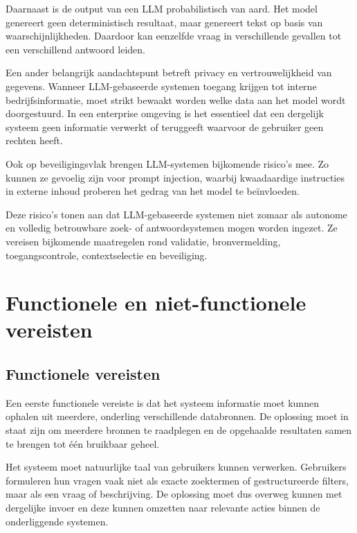 Daarnaast is de output van een \gls{LLM} probabilistisch van aard. Het model genereert geen deterministisch resultaat, maar genereert tekst op basis van waarschijnlijkheden. Daardoor kan eenzelfde vraag in verschillende gevallen tot een verschillend antwoord leiden.

Een ander belangrijk aandachtspunt betreft privacy en vertrouwelijkheid van gegevens. Wanneer \gls{LLM}-gebaseerde systemen toegang krijgen tot interne bedrijfsinformatie, moet strikt bewaakt worden welke data aan het model wordt doorgestuurd. In een enterprise omgeving is het essentieel dat een dergelijk systeem geen informatie verwerkt of teruggeeft waarvoor de gebruiker geen rechten heeft.

Ook op beveiligingsvlak brengen \gls{LLM}-systemen bijkomende risico's mee. Zo kunnen ze gevoelig zijn voor prompt injection, waarbij kwaadaardige instructies in externe inhoud proberen het gedrag van het model te beïnvloeden.

Deze risico's tonen aan dat \gls{LLM}-gebaseerde systemen niet zomaar als autonome en volledig betrouwbare zoek- of antwoordsystemen mogen worden ingezet. Ze vereisen bijkomende maatregelen rond validatie, bronvermelding, toegangscontrole, contextselectie en beveiliging.

\section{Functionele en niet-functionele vereisten}
\label{sec:vereisten}


\subsection{Functionele vereisten}
\label{subsec:functionele-vereisten}

Een eerste functionele vereiste is dat het systeem informatie moet kunnen ophalen uit meerdere, onderling verschillende databronnen. De oplossing moet in staat zijn om meerdere bronnen te raadplegen en de opgehaalde resultaten samen te brengen tot één bruikbaar geheel.

Het systeem moet natuurlijke taal van gebruikers kunnen verwerken. Gebruikers formuleren hun vragen vaak niet als exacte zoektermen of gestructureerde filters, maar als een vraag of beschrijving. De oplossing moet dus overweg kunnen met dergelijke invoer en deze kunnen omzetten naar relevante acties binnen de onderliggende systemen.

